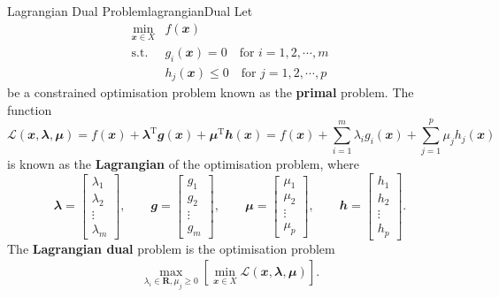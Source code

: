 \documentclass[math, code]{amznotes}
\theoremstyle{remark}
\begin{document}
\begin{dfnbox}{Lagrangian Dual Problem}{lagrangianDual}
    Let
    \begin{align*}
        \min_{\mathbfit{x} \in X} & f(\mathbfit{x}) \\
        \textrm{s.t. } & g_i(\mathbfit{x}) = 0 \quad\textrm{for } i = 1, 2, \cdots, m \\
        & h_j(\mathbfit{x}) \leq 0 \quad\textrm{for } j = 1, 2, \cdots, p
    \end{align*}
    be a constrained optimisation problem known as the {\color{red} \textbf{primal}} problem. The function
    \begin{equation*}
        \mathcal{L}(\mathbfit{x}, \mathbfit{\lambda}, \mathbfit{\mu}) = f(\mathbfit{x}) + \mathbfit{\lambda}^{\mathrm{T}}\mathbfit{g}(\mathbfit{x}) + \mathbfit{\mu}^{\mathrm{T}}\mathbfit{h}(\mathbfit{x}) = f(\mathbfit{x}) + \sum_{i = 1}^{m}\lambda_i g_i(\mathbfit{x}) + \sum_{j = 1}^{p}\mu_j h_j(\mathbfit{x})
    \end{equation*}
    is known as the {\color{red} \textbf{Lagrangian}} of the optimisation problem, where
    \begin{equation*}
        \mathbfit{\lambda} = \begin{bmatrix}
            \lambda_1 \\
            \lambda_2 \\
            \vdots \\
            \lambda_m
        \end{bmatrix}, \qquad \mathbfit{g} = \begin{bmatrix}
            g_1 \\
            g_2 \\
            \vdots \\
            g_m
        \end{bmatrix}, \qquad \mathbfit{\mu} = \begin{bmatrix}
            \mu_1 \\
            \mu_2 \\
            \vdots \\
            \mu_p
        \end{bmatrix}, \qquad \mathbfit{h} = \begin{bmatrix}
            h_1 \\
            h_2 \\
            \vdots \\
            h_p
        \end{bmatrix}.
    \end{equation*}
    The {\color{red} \textbf{Lagrangian dual}} problem is the optimisation problem
    \begin{align*}
        \max_{\lambda_i \in \mathbf{R}, \mu_j \geq 0}\left[\min_{\mathbfit{x}\in X}\mathcal{L}(\mathbfit{x}, \mathbfit{\lambda}, \mathbfit{\mu})\right].
    \end{align*}
    
\end{dfnbox}
\end{document}
